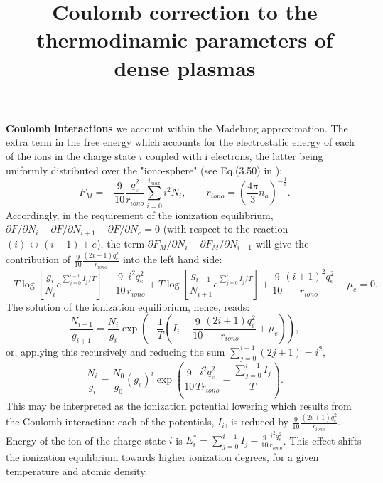 \documentclass[english,12pt]{revtex4}
\begin{document}
\title{{\Large Coulomb correction to the thermodinamic parameters of dense plasmas}}
\maketitle

{\bf Coulomb interactions} we account within the Madelung approximation. The extra term in the free energy which accounts for the
electrostatic energy of each of the ions in the charge state $i$ coupled with i electrons, the latter being uniformly
distributed over the "iono-sphere"
(see Eq.(3.50) in \cite{drake}):
\begin{equation}\label{fterm}
F_M=-\frac{9}{10} \frac{q_e^2}{r_{iono}} \sum_{i=0}^{i_{max}} i^2 N_i,\qquad
r_{iono} = \left( \frac{4 \pi}{3} n_a \right)^{-\frac13}.
\end{equation}
Accordingly, in the requirement of the ionization equilibrium, $\partial F/\partial N_i - \partial F/\partial N_{i+1} - \partial F/\partial N_e = 0$ (with respect to the reaction $(i)\leftrightarrow(i+1)+e$),
the term $\partial F_{M}/\partial N_i -\partial F_{M}/\partial N_{i+1}$ will 
give the contribution of $\frac{9}{10} \frac{(2i+1)q_e^2}{r_{iono}}$ into the left hand side:
\begin{equation}
-T \log \left[ \frac{g_i}    {N_i}     e^{\sum_{j=0}^{i-1} I_j/T} \right] - \frac{9}{10} \frac{i^2     q_e^2}{r_{iono}}
+T \log \left[ \frac{g_{i+1}}{N_{i+1}} e^{\sum_{j=0}^i     I_j/T} \right] + \frac{9}{10} \frac{(i+1)^2 q_e^2}{r_{iono}}
-\mu_e = 0.
\end{equation}
The solution of the ionization equilibrium, hence, reads:
\begin{equation}
\frac{N_{i+1}}{g_{i+1}} = \frac{N_i}{g_i} \exp\left(-\frac1T \left(I_i - \frac{9}{10} \frac{(2i+1) q_e^2}{r_{iono}} + \mu_e \right)\right),
\end{equation}
or, applying this recursively and reducing the sum $\sum_{j=0}^{i-1} (2j+1) = i^2$,
\begin{equation}\label{pfM}
\frac{N_i}{g_i}=\frac{N_0}{g_0}(g_e)^i \exp \left( \frac{9}{10} \frac{i^2 q_e^2}{T r_{iono}} -\frac{\sum_{j=0}^{i-1}I_j}T \right) .
\end{equation}
This may be interpreted as the ionization potential lowering which results from the Coulomb interaction:
each of the potentials, $I_i$, is reduced by $\frac{9}{10} \frac{(2i+1)q_e^2}{r_{iono}}$.
Energy of the ion of the charge state $i$ is $E_i^* = \sum_{j=0}^{i-1}I_j - \frac{9}{10} \frac{i^2 q_e^2}{r_{iono}}$.
This effect shifts the ionization equilibrium towards higher ionization degrees, for a given temperature and atomic density.
\end{document}
